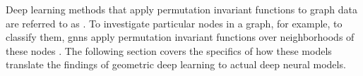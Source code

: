 Deep learning methods that apply permutation invariant functions to graph data are referred to as . To investigate particular nodes in a graph, for example, to classify them, \glspl{gnn} apply permutation invariant functions over neighborhoods of these nodes \cite{bronstein_geometric_2021}. The following section covers the specifics of how these models translate the findings of geometric deep learning to actual deep neural models.






